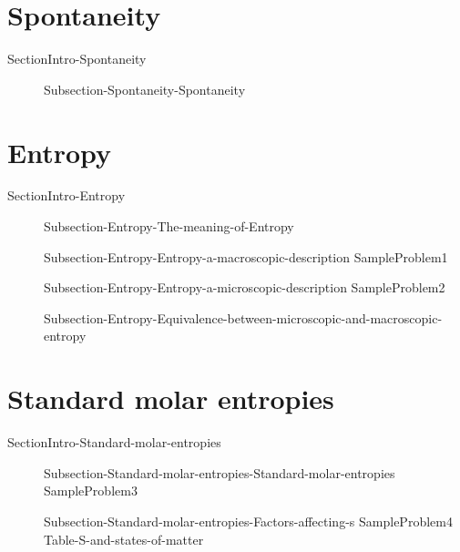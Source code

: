 \documentclass[main.tex]{subfiles}
\begin{document}
\section{Spontaneity}
{SectionIntro-Spontaneity}
\sloppy\begin{description}
\item[] {Subsection-Spontaneity-Spontaneity}
\end{description}




\section{Entropy}
{SectionIntro-Entropy}
\sloppy\begin{description}
\item[]{Subsection-Entropy-The-meaning-of-Entropy}
\item[]{Subsection-Entropy-Entropy-a-macroscopic-description}
{SampleProblem1}
\item[]{Subsection-Entropy-Entropy-a-microscopic-description}
{SampleProblem2}
 \item[]{Subsection-Entropy-Equivalence-between-microscopic-and-macroscopic-entropy}

\end{description}

\section{Standard molar entropies}
{SectionIntro-Standard-molar-entropies}
\sloppy\begin{description}
\item[]{Subsection-Standard-molar-entropies-Standard-molar-entropies}
{SampleProblem3}
\item[]{Subsection-Standard-molar-entropies-Factors-affecting-s}
    {SampleProblem4}
    {Table-S-and-states-of-matter}
\end{description}
 
\end{document}

